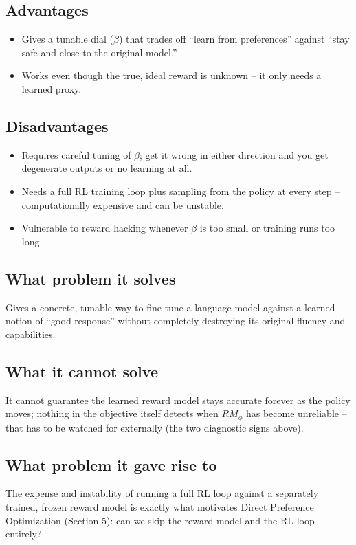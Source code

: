 \documentclass[11pt]{article}
\begin{document}
\subsection{Advantages}
\begin{itemize}
  \item Gives a tunable dial ($\beta$) that trades off ``learn from preferences''
  against ``stay safe and close to the original model.''
  \item Works even though the true, ideal reward is unknown -- it only needs a
  learned proxy.
\end{itemize}

\subsection{Disadvantages}
\begin{itemize}
  \item Requires careful tuning of $\beta$; get it wrong in either direction and
  you get degenerate outputs or no learning at all.
  \item Needs a full RL training loop plus sampling from the policy at every
  step -- computationally expensive and can be unstable.
  \item Vulnerable to reward hacking whenever $\beta$ is too small or training
  runs too long.
\end{itemize}

\subsection{What problem it solves}
Gives a concrete, tunable way to fine-tune a language model against a learned
notion of ``good response'' without completely destroying its original fluency
and capabilities.

\subsection{What it cannot solve}
It cannot guarantee the learned reward model stays accurate forever as the policy
moves; nothing in the objective itself detects when $RM_\phi$ has become
unreliable -- that has to be watched for externally (the two diagnostic signs
above).

\subsection{What problem it gave rise to}
The expense and instability of running a full RL loop against a separately
trained, frozen reward model is exactly what motivates Direct Preference
Optimization (Section 5): can we skip the reward model and the RL loop entirely?
\end{document}
